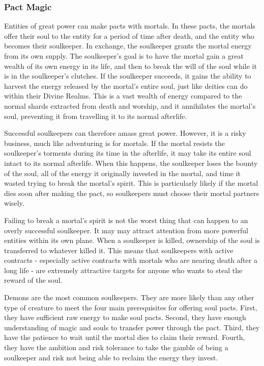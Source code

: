     \subsubsection{Pact Magic}
      Entities of great power can make pacts with mortals.
      In these pacts, the mortals offer their soul to the entity for a period of time after death, and the entity who becomes their soulkeeper.
      In exchange, the soulkeeper grants the mortal energy from its own supply.
      The soulkeeper's goal is to have the mortal gain a great wealth of its own energy in its life, and then to break the will of the soul while it is in the soulkeeper's clutches.
      If the soulkeeper succeeds, it gains the ability to harvest the energy released by the mortal's entire soul, just like deities can do within their Divine Realms.
      This is a vast wealth of energy compared to the normal shards extracted from death and worship, and it annihilates the mortal's soul, preventing it from travelling it to its normal afterlife.

      Successful soulkeepers can therefore amass great power.
      However, it is a risky business, much like adventuring is for mortals.
      If the mortal resists the soulkeeper's torments during its time in the afterlife, it may take its entire soul intact to its normal afterlife.
      When this happens, the soulkeeper loses the bounty of the soul, all of the energy it originally invested in the mortal, and time it wasted trying to break the mortal's spirit.
      This is particularly likely if the mortal dies soon after making the pact, so soulkeepers must choose their mortal partners wisely.

      Failing to break a mortal's spirit is not the worst thing that can happen to an overly successful soulkeeper.
      It may may attract attention from more powerful entities within its own plane.
      When a soulkeeper is killed, ownership of the soul is transferred to whatever killed it.
      This means that soulkeepers with active contracts - especially active contracts with mortals who are nearing death after a long life - are extremely attractive targets for anyone who wants to steal the reward of the soul.

      Demons are the most common soulkeepers.
      They are more likely than any other type of creature to meet the four main prerequisites for offering soul pacts.
      First, they have sufficient raw energy to make soul pacts.
      Second, they have enough understanding of magic and souls to transfer power through the pact.
      Third, they have the patience to wait until the mortal dies to claim their reward.
      Fourth, they have the ambition and risk tolerance to take the gamble of being a soulkeeper and risk not being able to reclaim the energy they invest.

